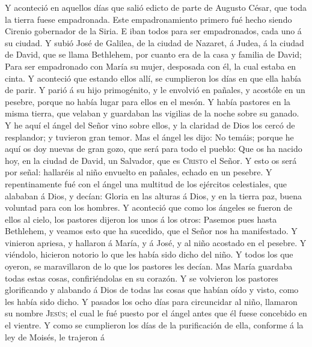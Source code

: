  Y aconteció en aquellos días que salió edicto de parte de
Augusto César, que toda la tierra fuese empadronada.  Este
empadronamiento primero fué hecho siendo Cirenio gobernador de la Siria.
 E iban todos para ser empadronados, cada uno á su ciudad.
 Y subió José de Galilea, de la ciudad de Nazaret, á
Judea, á la ciudad de David, que se llama Bethlehem, por cuanto era de
la casa y familia de David;  Para ser empadronado con
María su mujer, desposada con él, la cual estaba en cinta.
 Y aconteció que estando ellos allí, se cumplieron los
días en que ella había de parir.  Y parió á su hijo
primogénito, y le envolvió en pañales, y acostóle en un pesebre, porque
no había lugar para ellos en el mesón.  Y había pastores
en la misma tierra, que velaban y guardaban las vigilias de la noche
sobre su ganado.  Y he aquí el ángel del Señor vino sobre
ellos, y la claridad de Dios los cercó de resplandor; y tuvieron gran
temor.  Mas el ángel les dijo: No temáis; porque he aquí
os doy nuevas de gran gozo, que será para todo el pueblo:
 Que os ha nacido hoy, en la ciudad de David, un
Salvador, que es \textsc{Cristo} el Señor.  Y esto os
será por señal: hallaréis al niño envuelto en pañales, echado en un
pesebre.  Y repentinamente fué con el ángel una multitud
de los ejércitos celestiales, que alababan á Dios, y decían:
 Gloria en las alturas á Dios, y en la tierra paz, buena
voluntad para con los hombres.  Y aconteció que como los
ángeles se fueron de ellos al cielo, los pastores dijeron los unos á los
otros: Pasemos pues hasta Bethlehem, y veamos esto que ha sucedido, que
el Señor nos ha manifestado.  Y vinieron apriesa, y
hallaron á María, y á José, y al niño acostado en el pesebre.
 Y viéndolo, hicieron notorio lo que les había sido dicho
del niño.  Y todos los que oyeron, se maravillaron de lo
que los pastores les decían.  Mas María guardaba todas
estas cosas, confiriéndolas en su corazón.  Y se
volvieron los pastores glorificando y alabando á Dios de todas las cosas
que habían oído y visto, como les había sido dicho.  Y
pasados los ocho días para circuncidar al niño, llamaron su nombre
\textsc{Jesús}; el cual le fué puesto por el ángel antes que él fuese
concebido en el vientre.  Y como se cumplieron los días
de la purificación de ella, conforme á la ley de Moisés, le trajeron á
